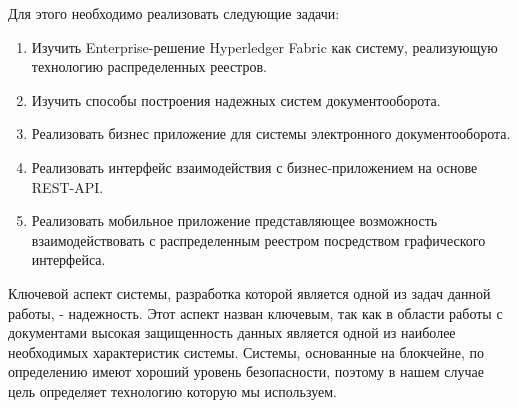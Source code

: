 Для этого необходимо реализовать следующие задачи:
\begin{enumerate}
	\item Изучить Enterprise-решение Hyperledger Fabric как систему, реализующую технологию распределенных реестров.
	\item Изучить способы построения надежных систем документооборота.
	\item Реализовать бизнес приложение для системы электронного документооборота.
	\item Реализовать интерфейс взаимодействия с бизнес-приложением на основе REST-API.
	\item Реализовать мобильное приложение представляющее возможность взаимодействовать с распределенным реестром посредством графического интерфейса.
\end{enumerate}

Ключевой аспект системы, разработка которой является одной из задач данной работы, - надежность. Этот аспект назван ключевым, так как в области работы с документами высокая защищенность данных является одной из наиболее необходимых характеристик системы. Системы, основанные на блокчейне, по определению имеют хороший уровень безопасности, поэтому в нашем случае цель определяет технологию которую мы используем.